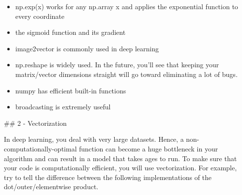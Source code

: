 \documentclass[11pt]{article}
\providecommand{\tightlist}{%
      \setlength{\itemsep}{0pt}\setlength{\parskip}{0pt}}
\begin{document}
\begin{itemize}
\tightlist
\item
  np.exp(x) works for any np.array x and applies the exponential
  function to every coordinate
\item
  the sigmoid function and its gradient
\item
  image2vector is commonly used in deep learning
\item
  np.reshape is widely used. In the future, you'll see that keeping your
  matrix/vector dimensions straight will go toward eliminating a lot of
  bugs.
\item
  numpy has efficient built-in functions
\item
  broadcasting is extremely useful
\end{itemize}

    \#\# 2 - Vectorization

In deep learning, you deal with very large datasets. Hence, a
non-computationally-optimal function can become a huge bottleneck in
your algorithm and can result in a model that takes ages to run. To make
sure that your code is computationally efficient, you will use
vectorization. For example, try to tell the difference between the
following implementations of the dot/outer/elementwise product.
\end{document}
